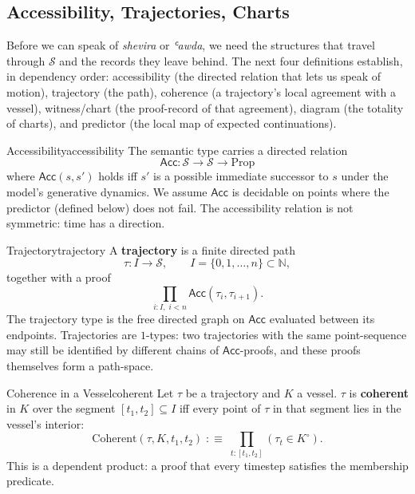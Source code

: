 \documentclass[11pt,a4paper]{article}
\begin{document}
\subsection{Accessibility, Trajectories, Charts}
\label{subsec:traj}

Before we can speak of \emph{shevira} or \emph{ʿawda}, we need the structures that travel through $\mathcal{S}$ and the records they leave behind. The next four definitions establish, in dependency order: accessibility (the directed relation that lets us speak of motion), trajectory (the path), coherence (a trajectory's local agreement with a vessel), witness/chart (the proof-record of that agreement), diagram (the totality of charts), and predictor (the local map of expected continuations).

\begin{defbox}{Accessibility}{accessibility}
The semantic type carries a directed relation
\[
\mathsf{Acc} : \mathcal{S} \to \mathcal{S} \to \mathrm{Prop}
\]
where $\mathsf{Acc}(s, s')$ holds iff $s'$ is a possible immediate successor to $s$ under the model's generative dynamics. We assume $\mathsf{Acc}$ is decidable on points where the predictor (defined below) does not fail. The accessibility relation is not symmetric: time has a direction.
\end{defbox}

\begin{defbox}{Trajectory}{trajectory}
A \textbf{trajectory} is a finite directed path
\[
\tau : I \to \mathcal{S}, \qquad I = \{0, 1, \ldots, n\} \subset \mathbb{N},
\]
together with a proof
\[
\prod_{i : I,\; i < n} \mathsf{Acc}(\tau_i, \tau_{i+1}).
\]
The trajectory type is the free directed graph on $\mathsf{Acc}$ evaluated between its endpoints. Trajectories are $1$-types: two trajectories with the same point-sequence may still be identified by different chains of $\mathsf{Acc}$-proofs, and these proofs themselves form a path-space.
\end{defbox}

\begin{defbox}{Coherence in a Vessel}{coherent}
Let $\tau$ be a trajectory and $K$ a vessel. $\tau$ is \textbf{coherent} in $K$ over the segment $[t_1, t_2] \subseteq I$ iff every point of $\tau$ in that segment lies in the vessel's interior:
\[
\mathrm{Coherent}(\tau, K, t_1, t_2) \;:\equiv\; \prod_{t : [t_1, t_2]} (\tau_t \in K^{\circ}).
\]
This is a dependent product: a proof that every timestep satisfies the membership predicate.
\end{defbox}
\end{document}
